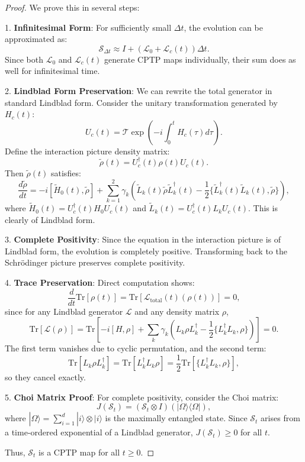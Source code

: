 \documentclass[12pt]{article}
\newcommand{\Tr}{\mathrm{Tr}}
\newcommand{\SJ}{\mathcal{S}}
\newcommand{\Lgen}{\mathcal{L}}
\newcommand{\T}{\mathcal{T}}
\begin{document}
\begin{proof}
We prove this in several steps:

1. \textbf{Infinitesimal Form}: For sufficiently small $\Delta t$, the evolution can be approximated as:
\[
\SJ_{\Delta t}\approx I + (\Lgen_0 + \Lgen_c(t))\Delta t.
\]
Since both $\Lgen_0$ and $\Lgen_c(t)$ generate CPTP maps individually, their sum does as well for infinitesimal time.

2. \textbf{Lindblad Form Preservation}: We can rewrite the total generator in standard Lindblad form. Consider the unitary transformation generated by $H_c(t)$:
\[
U_{c}(t) = \T\exp \left(-i\int_{0}^{t}H_{c}(\tau)d\tau\right).
\]
Define the interaction picture density matrix:
\[
\tilde{\rho} (t) = U_{c}^{\dagger}(t)\rho (t)U_{c}(t).
\]
Then $\tilde{\rho} (t)$ satisfies:
\[
\frac{d\tilde{\rho}}{dt} = -i[\tilde{H}_0(t),\tilde{\rho}] + \sum_{k = 1}^{2}\gamma_k\left(\tilde{L}_k(t)\tilde{\rho}\tilde{L}_k^\dagger (t) - \frac{1}{2}\{\tilde{L}_k^\dagger (t)\tilde{L}_k(t),\tilde{\rho}\} \right),
\]
where $\tilde{H}_0(t) = U_c^{\dagger}(t)H_0U_c(t)$ and $\tilde{L}_k(t) = U_c^{\dagger}(t)L_kU_c(t)$. This is clearly of Lindblad form.

3. \textbf{Complete Positivity}: Since the equation in the interaction picture is of Lindblad form, the evolution is completely positive. Transforming back to the Schrödinger picture preserves complete positivity.

4. \textbf{Trace Preservation}: Direct computation shows:
\[
\frac{d}{dt}\Tr[\rho (t)] = \Tr[\Lgen_{\mathrm{total}}(t)(\rho (t))] = 0,
\]
since for any Lindblad generator $\Lgen$ and any density matrix $\rho$,
\[
\Tr[\Lgen(\rho)] = \Tr\left[-i[H,\rho ] + \sum_k\gamma_k\left(L_k\rho L_k^\dagger -\frac{1}{2}\{L_k^\dagger L_k,\rho \}\right)\right] = 0.
\]
The first term vanishes due to cyclic permutation, and the second term:
\[
\Tr\left[L_k\rho L_k^\dagger\right] = \Tr\left[L_k^\dagger L_k\rho \right] = \frac{1}{2}\Tr\left[\{L_k^\dagger L_k,\rho \}\right],
\]
so they cancel exactly.

5. \textbf{Choi Matrix Proof}: For complete positivity, consider the Choi matrix:
\[
J(\SJ_t) = (\SJ_t\otimes I)(|\Omega \rangle \langle \Omega |),
\]
where $|\Omega \rangle = \sum_{i = 1}^{d}|i\rangle \otimes |i\rangle$ is the maximally entangled state. Since $\SJ_t$ arises from a time-ordered exponential of a Lindblad generator, $J(\SJ_t)\geq 0$ for all $t$.

Thus, $\SJ_t$ is a CPTP map for all $t\geq 0$.
\end{proof}
\end{document}
